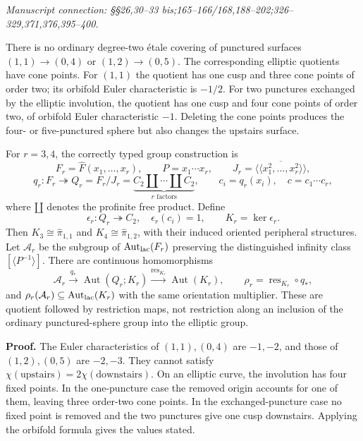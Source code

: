 \documentclass[10pt,a4paper]{article}
\begin{document}
\emph{Manuscript connection: \S{}\S{}26,30--33 bis;165--166/168,188--202;326--329,371,376,395--400.}

\nopagebreak[4]

There is no ordinary degree-two \'{e}tale covering of punctured surfaces \((1,1)\to(0,4)\) or \((1,2)\to(0,5)\). The corresponding elliptic quotients have cone points. For \((1,1)\) the quotient has one cusp and three cone points of order two; its orbifold Euler characteristic is \(-1/2\). For two punctures exchanged by the elliptic involution, the quotient has one cusp and four cone points of order two, of orbifold Euler characteristic \(-1\). Deleting the cone points produces the four- or five-punctured sphere but also changes the upstairs surface.

For \(r=3,4\), the correctly typed group construction is \[
 F_r=\widehat F(x_1,\ldots,x_r),\qquad
 P=x_1\cdots x_r,\qquad
 J_r=\overline{\langle\!\langle x_1^2,\ldots,x_r^2\rangle\!\rangle},
\] \[
 q_r:F_r\twoheadrightarrow
 Q_r=F_r/J_r=\underbrace{C_2\amalg\cdots\amalg C_2}_{r\text{ factors}},
 \qquad c_i=q_r(x_i),\quad c=c_1\cdots c_r,
\] where \(\amalg\) denotes the profinite free product. Define \[
 \epsilon_r:Q_r\twoheadrightarrow C_2,\quad
 \epsilon_r(c_i)=1,\qquad K_r=\ker\epsilon_r.
\] Then \(K_3\cong\widehat\pi_{1,1}\) and \(K_4\cong\widehat\pi_{1,2}\), with their induced oriented peripheral structures. Let \(\mathcal A_r\) be the subgroup of \(\operatorname{Aut}_{\rm lac}(F_r)\) preserving the distinguished infinity class \([\langle P^{-1}\rangle]\). There are continuous homomorphisms \[
 \mathcal A_r\xrightarrow{q_*}\operatorname{Aut}(Q_r;K_r)
 \xrightarrow{\operatorname{res}_{K_r}}\operatorname{Aut}(K_r),
 \qquad
 \rho_r=\operatorname{res}_{K_r}\circ q_*,
\] and \(\rho_r(\mathcal A_r)\subseteq\operatorname{Aut}_{\rm lac}(K_r)\) with the same orientation multiplier. These are quotient followed by restriction maps, not restriction along an inclusion of the ordinary punctured-sphere group into the elliptic group.

\textbf{Proof.} The Euler characteristics of \((1,1),(0,4)\) are \(-1,-2\), and those of \((1,2),(0,5)\) are \(-2,-3\). They cannot satisfy \(\chi(\text{upstairs})=2\chi(\text{downstairs})\). On an elliptic curve, the involution has four fixed points. In the one-puncture case the removed origin accounts for one of them, leaving three order-two cone points. In the exchanged-puncture case no fixed point is removed and the two punctures give one cusp downstairs. Applying the orbifold formula gives the values stated.
\end{document}
